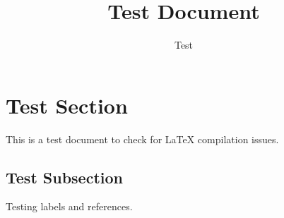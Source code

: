 \documentclass[12pt,a4paper]{article}
\title{Test Document}
\author{Test}
\begin{document}
\maketitle

\section{Test Section}
\label{sec:test}

This is a test document to check for LaTeX compilation issues.

\subsection{Test Subsection}
\label{subsec:test}

Testing labels and references.
\end{document}
